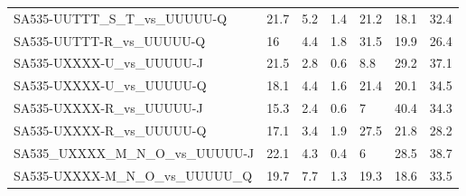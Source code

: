 \begin{landscape}
\begin{table}
{\begin{tabular}{|l|p{4em}|p{4em}|p{4em}|p{4em}|p{4em}|p{4em}|}
SA535-UUTTT\_S\_T\_vs\_UUUUU-Q    & 21.7 & 5.2 & 1.4 & 21.2 & 18.1 & 32.4 \\
SA535-UUTTT-R\_vs\_UUUUU-Q       & 16   & 4.4 & 1.8 & 31.5 & 19.9 & 26.4 \\
SA535-UXXXX-U\_vs\_UUUUU-J       & 21.5 & 2.8 & 0.6 & 8.8  & 29.2 & 37.1 \\
SA535-UXXXX-U\_vs\_UUUUU-Q       & 18.1 & 4.4 & 1.6 & 21.4 & 20.1 & 34.5 \\
SA535-UXXXX-R\_vs\_UUUUU-J       & 15.3 & 2.4 & 0.6 & 7    & 40.4 & 34.3 \\
SA535-UXXXX-R\_vs\_UUUUU-Q       & 17.1 & 3.4 & 1.9 & 27.5 & 21.8 & 28.2 \\
SA535\_UXXXX\_M\_N\_O\_vs\_UUUUU-J & 22.1 & 4.3 & 0.4 & 6    & 28.5 & 38.7 \\
SA535-UXXXX-M\_N\_O\_vs\_UUUUU\_Q & 19.7 & 7.7 & 1.3 & 19.3 & 18.6 & 33.5 \\
  \hline
 \end{tabular}%
 }
\label{tab:DEpercentageincisintrans}
\end{table}
\end{landscape}


